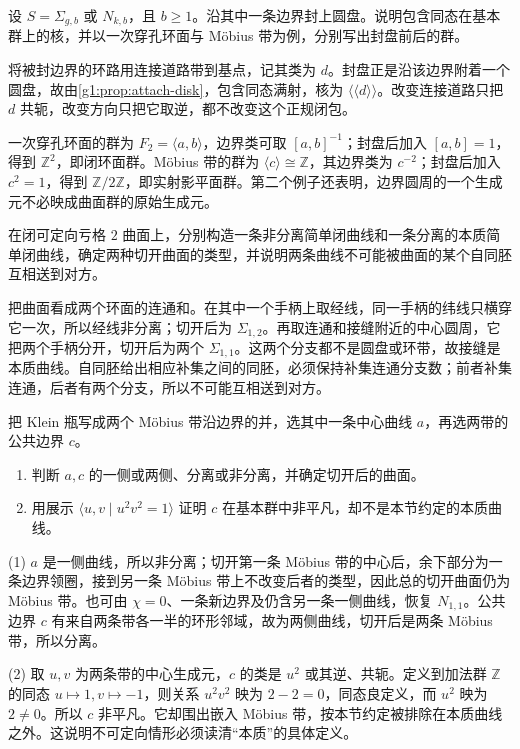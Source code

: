 \begin{exercise}\label{g1:ex:capping-surface-group}
	设 \(S=\Sigma_{g,b}\) 或 \(N_{k,b}\)，且 \(b\ge1\)。沿其中一条边界封上圆盘。说明包含同态在基本群上的核，并以一次穿孔环面与 Möbius 带为例，分别写出封盘前后的群。
\end{exercise}
\begin{solution}
	将被封边界的环路用连接道路带到基点，记其类为 \(d\)。封盘正是沿该边界附着一个圆盘，故由\cref{g1:prop:attach-disk}，包含同态满射，核为 \(\langle\!\langle d\rangle\!\rangle\)。改变连接道路只把 \(d\) 共轭，改变方向只把它取逆，都不改变这个正规闭包。

	一次穿孔环面的群为 \(F_2=\langle a,b\rangle\)，边界类可取 \([a,b]^{-1}\)；封盘后加入 \([a,b]=1\)，得到 \(\mathbb Z^2\)，即闭环面群。Möbius 带的群为 \(\langle c\rangle\cong\mathbb Z\)，其边界类为 \(c^{-2}\)；封盘后加入 \(c^2=1\)，得到 \(\mathbb Z/2\mathbb Z\)，即实射影平面群。第二个例子还表明，边界圆周的一个生成元不必映成曲面群的原始生成元。
\end{solution}

\begin{exercise}\label{g1:ex:genus-two-cuts}
	在闭可定向亏格 \(2\) 曲面上，分别构造一条非分离简单闭曲线和一条分离的本质简单闭曲线，确定两种切开曲面的类型，并说明两条曲线不可能被曲面的某个自同胚互相送到对方。
\end{exercise}
\begin{solution}
	把曲面看成两个环面的连通和。在其中一个手柄上取经线，同一手柄的纬线只横穿它一次，所以经线非分离；切开后为 \(\Sigma_{1,2}\)。再取连通和接缝附近的中心圆周，它把两个手柄分开，切开后为两个 \(\Sigma_{1,1}\)。这两个分支都不是圆盘或环带，故接缝是本质曲线。自同胚给出相应补集之间的同胚，必须保持补集连通分支数；前者补集连通，后者有两个分支，所以不可能互相送到对方。
\end{solution}

\begin{exercise}\label{g1:ex:klein-curve-types}
	把 Klein 瓶写成两个 Möbius 带沿边界的并，选其中一条中心曲线 \(a\)，再选两带的公共边界 \(c\)。
	\begin{enumerate}
		\item 判断 \(a,c\) 的一侧或两侧、分离或非分离，并确定切开后的曲面。
		\item 用展示 \(\langle u,v\mid u^2v^2=1\rangle\) 证明 \(c\) 在基本群中非平凡，却不是本节约定的本质曲线。
	\end{enumerate}
\end{exercise}
\begin{solution}
	(1) \(a\) 是一侧曲线，所以非分离；切开第一条 Möbius 带的中心后，余下部分为一条边界领圈，接到另一条 Möbius 带上不改变后者的类型，因此总的切开曲面仍为 Möbius 带。也可由 \(\chi=0\)、一条新边界及仍含另一条一侧曲线，恢复 \(N_{1,1}\)。公共边界 \(c\) 有来自两条带各一半的环形邻域，故为两侧曲线，切开后是两条 Möbius 带，所以分离。

	(2) 取 \(u,v\) 为两条带的中心生成元，\(c\) 的类是 \(u^2\) 或其逆、共轭。定义到加法群 \(\mathbb Z\) 的同态 \(u\mapsto1,v\mapsto-1\)，则关系 \(u^2v^2\) 映为 \(2-2=0\)，同态良定义，而 \(u^2\) 映为 \(2\ne0\)。所以 \(c\) 非平凡。它却围出嵌入 Möbius 带，按本节约定被排除在本质曲线之外。这说明不可定向情形必须读清“本质”的具体定义。
\end{solution}

